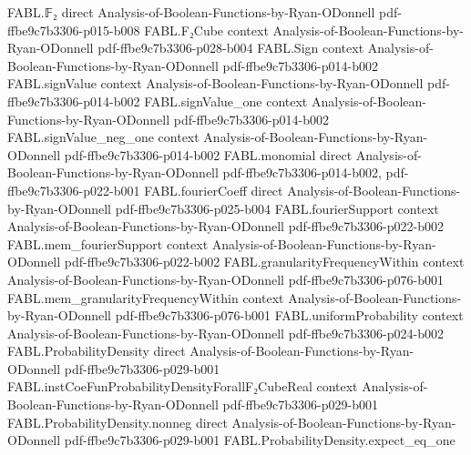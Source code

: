 \begin{theorem}
\label{FABL.densityExpectation_convolution_sq_eq_pair}
\leanok
{}
\proofstep
  {FABL.𝔽₂}
  {direct}
  {Analysis-of-Boolean-Functions-by-Ryan-ODonnell}
  {pdf-ffbe9c7b3306-p015-b008}
\proofstep
  {FABL.F₂Cube}
  {context}
  {Analysis-of-Boolean-Functions-by-Ryan-ODonnell}
  {pdf-ffbe9c7b3306-p028-b004}
\proofstep
  {FABL.Sign}
  {context}
  {Analysis-of-Boolean-Functions-by-Ryan-ODonnell}
  {pdf-ffbe9c7b3306-p014-b002}
\proofstep
  {FABL.signValue}
  {context}
  {Analysis-of-Boolean-Functions-by-Ryan-ODonnell}
  {pdf-ffbe9c7b3306-p014-b002}
\proofstep
  {FABL.signValue_one}
  {context}
  {Analysis-of-Boolean-Functions-by-Ryan-ODonnell}
  {pdf-ffbe9c7b3306-p014-b002}
\proofstep
  {FABL.signValue_neg_one}
  {context}
  {Analysis-of-Boolean-Functions-by-Ryan-ODonnell}
  {pdf-ffbe9c7b3306-p014-b002}
\proofstep
  {FABL.monomial}
  {direct}
  {Analysis-of-Boolean-Functions-by-Ryan-ODonnell}
  {pdf-ffbe9c7b3306-p014-b002,
    pdf-ffbe9c7b3306-p022-b001}
\proofstep
  {FABL.fourierCoeff}
  {direct}
  {Analysis-of-Boolean-Functions-by-Ryan-ODonnell}
  {pdf-ffbe9c7b3306-p025-b004}
\proofstep
  {FABL.fourierSupport}
  {context}
  {Analysis-of-Boolean-Functions-by-Ryan-ODonnell}
  {pdf-ffbe9c7b3306-p022-b002}
\proofstep
  {FABL.mem_fourierSupport}
  {context}
  {Analysis-of-Boolean-Functions-by-Ryan-ODonnell}
  {pdf-ffbe9c7b3306-p022-b002}
\proofstep
  {FABL.granularityFrequencyWithin}
  {context}
  {Analysis-of-Boolean-Functions-by-Ryan-ODonnell}
  {pdf-ffbe9c7b3306-p076-b001}
\proofstep
  {FABL.mem_granularityFrequencyWithin}
  {context}
  {Analysis-of-Boolean-Functions-by-Ryan-ODonnell}
  {pdf-ffbe9c7b3306-p076-b001}
\proofstep
  {FABL.uniformProbability}
  {context}
  {Analysis-of-Boolean-Functions-by-Ryan-ODonnell}
  {pdf-ffbe9c7b3306-p024-b002}
\proofstep
  {FABL.ProbabilityDensity}
  {direct}
  {Analysis-of-Boolean-Functions-by-Ryan-ODonnell}
  {pdf-ffbe9c7b3306-p029-b001}
\proofstep
  {FABL.instCoeFunProbabilityDensityForallF₂CubeReal}
  {context}
  {Analysis-of-Boolean-Functions-by-Ryan-ODonnell}
  {pdf-ffbe9c7b3306-p029-b001}
\proofstep
  {FABL.ProbabilityDensity.nonneg}
  {direct}
  {Analysis-of-Boolean-Functions-by-Ryan-ODonnell}
  {pdf-ffbe9c7b3306-p029-b001}
\proofstep
  {FABL.ProbabilityDensity.expect_eq_one}

\end{theorem}
